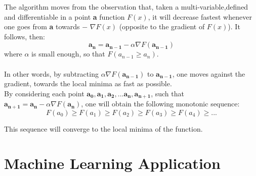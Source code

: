 \documentclass[conference]{IEEEtran}
\begin{document}
The algorithm moves from the observation that, taken a multi-variable,defined and differentiable in a point \textbf{a} function $F(x)$, it will decrease fastest whenever one goes from \textbf{a}  towards $-$ $\nabla F(x)$  (opposite to the gradient of $F(x)$).
It follows, then:
\begin{equation}
    \mathbf{a_{n}} = \mathbf{a_{n-1}} - \alpha\nabla F(\mathbf{a_{n-1}})\label{eq:original}
\end{equation}
where $\alpha$ is small enough, so that $F(a_{n-1} \geq a_{n})$.\\\\
In other words, by subtracting $\alpha\nabla F(\mathbf{a_{n-1}})$ to $\mathbf{a_{n-1}}$, one moves against the gradient, towards the local minima as fast as possible. \\By considering each point $\mathbf{a_{0}},\mathbf{a_{1}},\mathbf{a_{2}},...\mathbf{a_{n},\mathbf{a_{n+1}}}$, such that 
$\mathbf{a_{n+1}} = \mathbf{a_{n}} - \alpha\nabla F(\mathbf{a_{n}})$, one will obtain the following monotonic sequence:
\[
   F(a_{0}) \geq F(a_{1})\geq F(a_{2})\geq F(a_{3})\geq F(a_{4}) \geq ...
\]

This sequence will converge to the local minima of the function.\cite{Wikipedia}



\section{Machine Learning Application}
\end{document}
